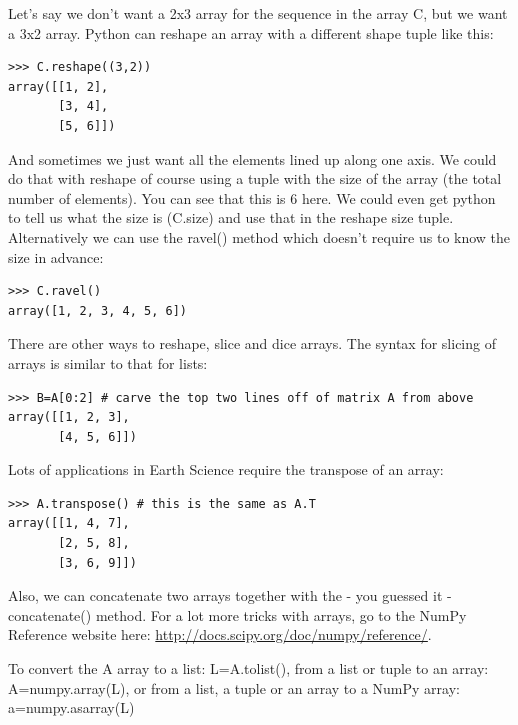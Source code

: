 \documentclass[11pt]{book}
\begin{document}
{{Let's say we don't want a 2x3 array for the sequence in the array {\color{blue}C}, but we want a 3x2 array.  Python can reshape an array with a different shape tuple like this:
   { \color{blue} \begin{verbatim}
>>> C.reshape((3,2))
array([[1, 2],
       [3, 4],
       [5, 6]])
\end{verbatim}}

And sometimes we just want all the elements lined up along one axis. We could do that with {\color{blue}reshape} of course using a tuple  with the size of the array (the total number of elements). You  can see that this is 6 here. We could even get python to tell us what the size is ({\color{blue}C.size}) and use that in the reshape size tuple.  Alternatively we can use the {\color{blue}ravel()} method which doesn't require us to know the size in advance:

   { \color{blue} \begin{verbatim}
>>> C.ravel()
array([1, 2, 3, 4, 5, 6])
\end{verbatim}}

There are other ways to reshape, slice and dice arrays.
The syntax for slicing of arrays is similar to that for lists:
{ \color{blue} \begin{verbatim}
>>> B=A[0:2] # carve the top two lines off of matrix A from above
array([[1, 2, 3],
       [4, 5, 6]])
\end{verbatim}}

Lots of applications in Earth Science require the transpose of an array:
{ \color{blue} \begin{verbatim}
>>> A.transpose() # this is the same as A.T
array([[1, 4, 7],
       [2, 5, 8],
       [3, 6, 9]])
\end{verbatim}}

Also, we can concatenate two arrays together with the - you guessed it - {\color{blue}concatenate()} method.   For a lot more tricks with arrays, go to the NumPy Reference website here:  \url{http://docs.scipy.org/doc/numpy/reference/}.


To convert the {\color{blue}A} array to a list:   {\color{blue}L=A.tolist()},  from a list or tuple to an array:   {\color{blue}A=numpy.array(L)}, or from a list, a tuple or an array to a NumPy array:   {\color{blue}a=numpy.asarray(L)}

}}
\end{document}
